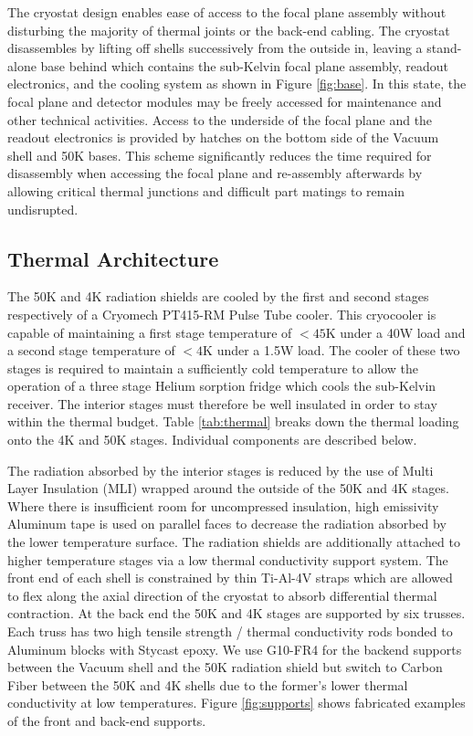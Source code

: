 \documentclass[]{spie}  %
\begin{document}
The cryostat design enables ease of access to the focal plane assembly without
disturbing the majority of thermal joints or the back-end cabling. The
cryostat disassembles by lifting off shells successively
from the outside in, leaving a stand-alone base behind which contains the
sub-Kelvin focal plane assembly, readout electronics, and the cooling system as shown in Figure
\ref{fig:base}. In this state, the focal plane and detector modules may be
freely accessed for maintenance and other technical activities. Access to the
underside of the focal plane and the readout electronics is provided by
hatches on the bottom side of the Vacuum shell and 50K bases. This scheme
significantly reduces the time required for disassembly when accessing the
focal plane and re-assembly afterwards by allowing critical thermal junctions
and difficult part matings to remain undisrupted.



\subsection{Thermal Architecture}


 The 50K and 4K radiation shields are cooled by the first
and second stages respectively of a Cryomech PT415-RM Pulse Tube cooler. This
cryocooler is capable of maintaining a first stage temperature of $<45$K under
a 40W load and a second stage temperature of $<4$K under a
1.5W load. The cooler of these two stages is required to maintain a
sufficiently cold temperature to allow the operation of a three stage Helium
sorption fridge which cools the sub-Kelvin receiver. The interior stages must
therefore be well insulated in order to stay within the thermal budget. Table
\ref{tab:thermal} breaks down the thermal loading onto the 4K and 50K stages.
Individual components are described below.


The radiation absorbed by the interior stages is reduced by the use of Multi
Layer Insulation (MLI) wrapped around the outside of the 50K and 4K stages. Where
there is insufficient room for uncompressed insulation, high emissivity
Aluminum tape is used on parallel faces to decrease the radiation absorbed by the lower
temperature surface. The radiation shields are additionally attached to higher temperature stages
via a low thermal conductivity support system. The front end of each shell is
constrained by thin Ti-Al-4V straps which are allowed to flex along the axial
direction of the cryostat to absorb differential thermal contraction. At the
back end the 50K and 4K stages are supported by six trusses. Each truss has two high
tensile strength / thermal conductivity rods bonded to Aluminum blocks with
Stycast epoxy. We use G10-FR4 for the backend supports between the Vacuum
shell and the 50K radiation shield but switch to Carbon Fiber between the 50K
and 4K shells due to the former's lower thermal conductivity at low
temperatures. Figure \ref{fig:supports} shows fabricated examples of the
front and back-end supports.
\end{document}
